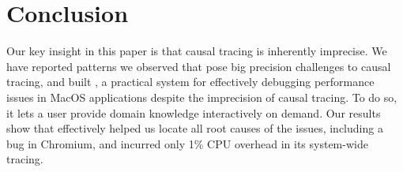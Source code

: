 \section{Conclusion} \label{sec:conclusion}
Our key insight in this paper is that causal tracing is inherently
imprecise. We have reported patterns we observed that pose big precision
challenges to causal tracing, and built \xxx, a practical system for
effectively debugging performance issues in MacOS applications despite the
imprecision of causal tracing.  To do so, it lets a user provide domain
knowledge interactively on demand. Our results show that \xxx effectively
helped us locate all root causes of the issues, including a bug in Chromium,
 and incurred only 1\% CPU
overhead in its system-wide tracing.


